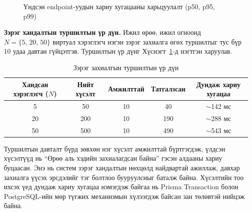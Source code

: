 \begin{figure}[H]
  \centering
  \caption{Үндсэн endpoint-уудын хариу хугацааны харьцуулалт (p50, p95, p99)}
  \label{fig:latency-chart}
\end{figure}

\textbf{Зэрэг хандалтын туршилтын үр дүн.} Ижил өрөө, ижил огноонд $N=\{5,\,20,\,50\}$ виртуал хэрэглэгч нэгэн зэрэг захиалга өгөх туршилтыг тус бүр 10 удаа давтан гүйцэтгэв. Туршилтын үр дүнг Хүснэгт~\ref{tab:concurrency-test}-д нэгтгэн харуулав.

\begin{table}[H]
  \centering
  \caption{Зэрэг захиалгын туршилтын үр дүн}
  \label{tab:concurrency-test}
  \begin{tabular}{ccccc}
    \toprule
    \textbf{Хандсан хэрэглэгч ($N$)} & \textbf{Нийт хүсэлт} & \textbf{Амжилттай} & \textbf{Татгалзсан} & \textbf{Дундаж хариу хугацаа} \\
    \midrule
    5  & 50  & 10 & 40  & $\sim$142 мс \\
    20 & 200 & 10 & 190 & $\sim$288 мс \\
    50 & 500 & 10 & 490 & $\sim$543 мс \\
    \bottomrule
  \end{tabular}
\end{table}

Туршилтын давталт бүрд зөвхөн нэг хүсэлт амжилттай бүртгэгдэж, үлдсэн хүсэлтүүд нь ``Өрөө аль хэдийн захиалагдсан байна'' гэсэн алдааны хариу буцаасан. Энэ нь систем зэрэг хандалтын нөхцөлд найдвартай ажиллаж, давхар захиалга үүсэх эрсдэлийг тэг болтлоо бууруулсныг баталж байна. Хүсэлтийн тоо ихсэх үед дундаж хариу хугацаа нэмэгдэж байгаа нь Prisma Transaction болон PostgreSQL-ийн мөр түгжих механизмын хүлээгдэж байсан зан төлөвтэй нийцэж байна.


